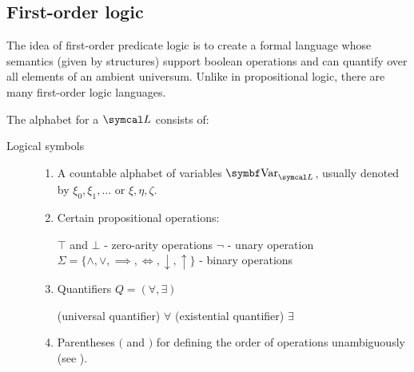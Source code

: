 \subsection{First-order logic}\label{subsec:first_order_logic}

\begin{definition}\label{def:first_order_logic_language}\cite[187]{OpenLogic20201202}
  The idea of first-order predicate logic is to create a formal language whose semantics (given by structures) support boolean operations and can quantify over all elements of an ambient universum. Unlike in propositional logic, there are many first-order logic languages.

  The alphabet for a  \( \Cal{L} \) consists of:
  \begin{description}
    \item[Logical symbols]
    \mbox{}
    \begin{enumerate}
      \item A countable alphabet of variables \( \Cat{Var}_{\Cal{L}} \), usually denoted by \( \xi_0, \xi_1, \ldots \) or \( \xi, \eta, \zeta \).

      \item Certain propositional operations:
      \begin{description}
         \( \top \) and \( \bot \) - zero-arity operations
         \( \neg \) - unary operation
         \( \Sigma = \{ \land, \lor, \implies, \iff, \downarrow, \uparrow \} \) - binary operations
      \end{description}

      \item Quantifiers \( Q = ( \forall, \exists ) \)
      \begin{description}
        (universal quantifier) \( \forall \)
        (existential quantifier) \( \exists \)
      \end{description}

      \item Parentheses \( ( \) and \( ) \) for defining the order of operations unambiguously (see ).


\end{enumerate}
\end{description}
\end{definition}
